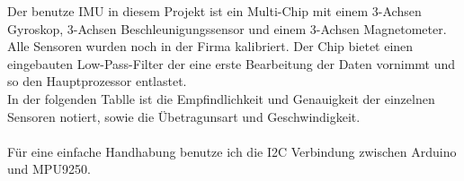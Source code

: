 Der benutze IMU in diesem Projekt ist ein Multi-Chip mit einem
3-Achsen Gyroskop, 3-Achsen Beschleunigungssensor und einem 3-Achsen Magnetometer.
Alle Sensoren wurden noch in der Firma kalibriert. Der Chip bietet einen
eingebauten Low-Pass-Filter der eine erste Bearbeitung der Daten vornimmt 
und so den Hauptprozessor entlastet.\\
In der folgenden Tablle ist die Empfindlichkeit und Genauigkeit der 
einzelnen Sensoren notiert, sowie die Übetragunsart und Geschwindigkeit.\\
\\
Für eine einfache Handhabung benutze ich die I2C Verbindung zwischen 
Arduino und MPU9250.
